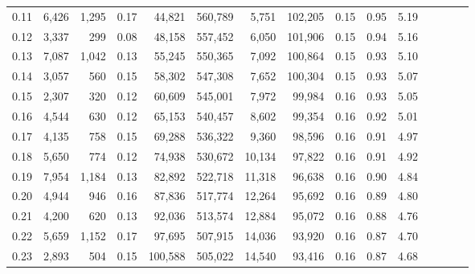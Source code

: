 \begin{tabular}{rrrcrrrrrrrrrrr}
0.11 &   6,426 &  1,295 &                                       0.17 &   44,821 &  560,789 &    5,751 &  102,205 &  0.15 &  0.95 &                         5.19 \\
0.12 &   3,337 &    299 &                                       0.08 &   48,158 &  557,452 &    6,050 &  101,906 &  0.15 &  0.94 &                         5.16 \\
0.13 &   7,087 &  1,042 &                                       0.13 &   55,245 &  550,365 &    7,092 &  100,864 &  0.15 &  0.93 &                         5.10 \\
0.14 &   3,057 &    560 &                                       0.15 &   58,302 &  547,308 &    7,652 &  100,304 &  0.15 &  0.93 &                         5.07 \\
0.15 &   2,307 &    320 &                                       0.12 &   60,609 &  545,001 &    7,972 &   99,984 &  0.16 &  0.93 &                         5.05 \\
0.16 &   4,544 &    630 &                                       0.12 &   65,153 &  540,457 &    8,602 &   99,354 &  0.16 &  0.92 &                         5.01 \\
0.17 &   4,135 &    758 &                                       0.15 &   69,288 &  536,322 &    9,360 &   98,596 &  0.16 &  0.91 &                         4.97 \\
0.18 &   5,650 &    774 &                                       0.12 &   74,938 &  530,672 &   10,134 &   97,822 &  0.16 &  0.91 &                         4.92 \\
0.19 &   7,954 &  1,184 &                                       0.13 &   82,892 &  522,718 &   11,318 &   96,638 &  0.16 &  0.90 &                         4.84 \\
0.20 &   4,944 &    946 &                                       0.16 &   87,836 &  517,774 &   12,264 &   95,692 &  0.16 &  0.89 &                         4.80 \\
0.21 &   4,200 &    620 &                                       0.13 &   92,036 &  513,574 &   12,884 &   95,072 &  0.16 &  0.88 &                         4.76 \\
0.22 &   5,659 &  1,152 &                                       0.17 &   97,695 &  507,915 &   14,036 &   93,920 &  0.16 &  0.87 &                         4.70 \\
0.23 &   2,893 &    504 &                                       0.15 &  100,588 &  505,022 &   14,540 &   93,416 &  0.16 &  0.87 &                         4.68 \\

\end{tabular}

